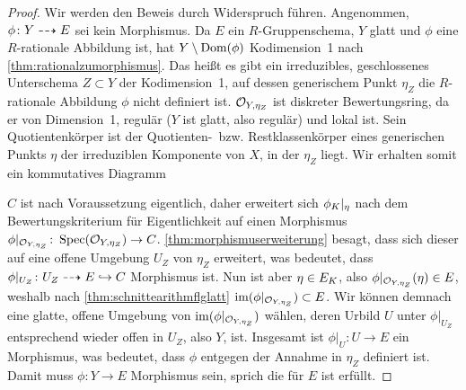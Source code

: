 \begin{Satz}
\begin{proof}
    Wir werden den Beweis durch Widerspruch führen.
    Angenommen, $\phi\colon Y\dashrightarrow E$ sei kein Morphismus.
    Da $E$ ein $R$-Gruppenschema, $Y$ glatt und $\phi$ eine
    $R$-rationale Abbildung ist, hat $Y\setminus\operatorname{Dom}(\phi)$
    Kodimension~1 nach \ref{thm:rationalzumorphismus}.
    Das heißt es gibt ein irreduzibles, geschlossenes Unterschema
    $Z\subset Y$ der Kodimension~1, auf dessen generischem Punkt
    $\eta_Z$ die $R$-rationale Abbildung $\phi$ nicht definiert ist.
    $\mathcal{O}_{Y,\eta_Z}$ ist diskreter Bewertungsring, da er von
    Dimension~1, regulär ($Y$ ist glatt, also
    regulär) und lokal ist.
    Sein Quotientenkörper ist der Quotienten-~bzw. Restklassenkörper
    eines generischen Punkts $\eta$ der irreduziblen Komponente von
    $X$, in der $\eta_Z$ liegt. Wir erhalten somit ein kommutatives
    Diagramm
    \begin{center}
    \end{center}
    $C$ ist nach Voraussetzung eigentlich, daher erweitert sich
    $\phi_{K}|_{\eta}$ nach dem Bewertungskriterium für
    Eigentlichkeit auf einen Morphismus
    $\phi|_{\mathcal{O}_{Y,\eta_Z}}\colon\operatorname{Spec}(\mathcal{O}_{Y,\eta_Z})\to C$.
    \ref{thm:morphismuserweiterung} besagt, dass sich
    dieser auf eine offene Umgebung $U_Z$ von $\eta_Z$ erweitert,
    was bedeutet, dass $\phi|_{U_Z}\colon U_Z\dashrightarrow E\hookrightarrow C$
    Morphismus ist.
    Nun ist aber $\eta\in E_{K}$, also
    $\phi|_{\mathcal{O}_{Y,\eta_Z}}(\eta)\in E$, weshalb nach
    \ref{thm:schnittearithmflglatt}
    $\operatorname{im}(\phi|_{\mathcal{O}_{Y,\eta_Z}})\subset E$.
    Wir können demnach eine glatte, offene Umgebung von
    $\operatorname{im}(\phi|_{\mathcal{O}_{Y,\eta_Z}})$ wählen, deren Urbild $U$ unter
    $\phi|_{U_Z}$ entsprechend wieder offen in $U_Z$, also $Y$, ist.
    Insgesamt ist $\phi|_U\colon U\to E$ ein Morphismus, was
    bedeutet, dass $\phi$ entgegen der Annahme in $\eta_Z$ definiert
    ist.
    Damit muss $\phi\colon Y\to E$ Morphismus sein, sprich die
    \NAbbEig für $E$ ist erfüllt.
    

\end{proof}
\end{Satz}
